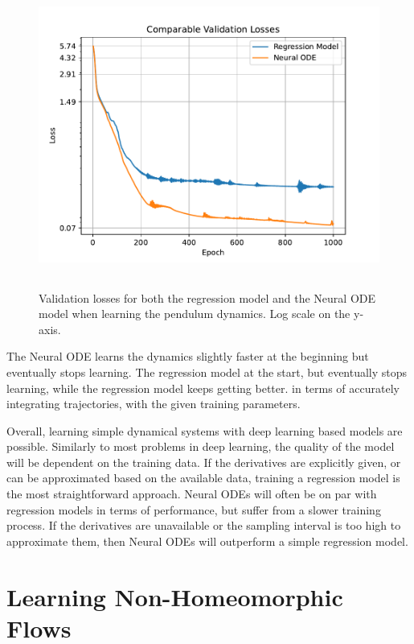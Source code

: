 \documentclass[12pt,a4paper]{book}
\begin{document}
\begin{figure}[H]
    \centering
    \includegraphics[height=10cm]{figs/plots/basic_experiments/single_pendulum_loss_comparison_h01_T1.pdf}
    \caption{Validation losses for both the regression model and the Neural ODE model when learning the pendulum dynamics. Log scale on the y-axis.}
    \label{fig:single_pendulum_loss_comparison_h01_T1}
\end{figure}

The Neural ODE learns the dynamics slightly faster at the beginning but eventually stops learning. The regression model at the start, but eventually stops learning, while the regression model keeps getting better. in terms of accurately integrating trajectories, with the given training parameters.

Overall, learning simple dynamical systems with deep learning based models are possible. Similarly to most problems in deep learning, the quality of the model will be dependent on the training data. If the derivatives are explicitly given, or can be approximated based on the available data, training a regression model is the most straightforward approach. Neural ODEs will often be on par with regression models in terms of performance, but suffer from a slower training process. If the derivatives are unavailable or the sampling interval is too high to approximate them, then Neural ODEs will outperform a simple regression model.

\section{Learning Non-Homeomorphic Flows}
\end{document}
